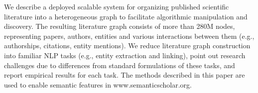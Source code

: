 We describe a deployed scalable system for organizing published scientific literature into a heterogeneous graph to facilitate algorithmic manipulation and discovery. The resulting literature graph consists of more than 280M nodes, representing papers, authors, entities and various interactions between them (e.g., authorships, citations, entity mentions). We reduce literature graph construction into familiar NLP tasks (e.g., entity extraction and linking), point out research challenges due to differences from standard formulations of these tasks, and report empirical results for each task. The methods described in this paper are used to enable semantic features in www.semanticscholar.org.
